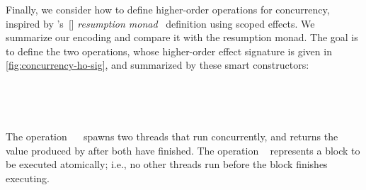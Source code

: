 Finally, we consider how to define higher-order operations for concurrency, inspired by \citeauthor{YangPWBS22}'s~[\citeyear{YangPWBS22}] \emph{resumption monad}~\cite{Claessen99,Schmidt1986denotational,PirogG14} definition using scoped effects.
We summarize our encoding and compare it with the resumption monad. The goal is to define the two operations, whose higher-order effect signature is given in \cref{fig:concurrency-ho-sig}, and summarized by these smart constructors:
%
%
\begin{code}[hide]%
\>[0][@{}l@{\AgdaIndent{1}}]%
\>[2]\AgdaSpace{}%
\AgdaModule{\AgdaUnderscore{}}\AgdaSpace{}%
\AgdaSpace{}%
\AgdaSpace{}%
\AgdaSymbol{:}\AgdaSpace{}%
\AgdaSpace{}%
\AgdaSpace{}%
\<%
\\
\>[2][@{}l@{\AgdaIndent{0}}]%
\>[4]\<%
\end{code}
\begin{code}%
\>[4][@{}l@{\AgdaIndent{1}}]%
\>[6]%
\>[16]\AgdaSymbol{:}\AgdaSpace{}%
\AgdaSymbol{\{}\AgdaSpace{}%
\AgdaSymbol{:}\AgdaSpace{}%
\AgdaSymbol{\}}\AgdaSpace{}%
\AgdaSpace{}%
\AgdaSymbol{(}\AgdaSpace{}%
\AgdaSpace{}%
\AgdaSymbol{:}\AgdaSpace{}%
\AgdaSpace{}%
\AgdaSpace{}%
\AgdaSpace{}%
\AgdaSpace{}%
\AgdaSymbol{)}%
\>[57]\AgdaSpace{}%
\AgdaSpace{}%
\AgdaSpace{}%
\AgdaSpace{}%
\AgdaSpace{}%
\<%
\\
%
\>[6]%
\>[16]\AgdaSymbol{:}\AgdaSpace{}%
\AgdaSymbol{\{}\AgdaSpace{}%
\AgdaSymbol{:}\AgdaSpace{}%
\AgdaSymbol{\}}\AgdaSpace{}%
\AgdaSpace{}%
\AgdaSpace{}%
\AgdaSpace{}%
\AgdaSpace{}%
\AgdaSpace{}%
%
\>[57]\AgdaSpace{}%
\AgdaSpace{}%
\AgdaSpace{}%
\AgdaSpace{}%
\AgdaSpace{}%
\<%
\end{code}
%
The operation ~~ spawns two threads that run concurrently, and returns the value produced by  after both have finished.
The operation ~ represents a block to be executed atomically; i.e., no other threads run before the block finishes executing.

